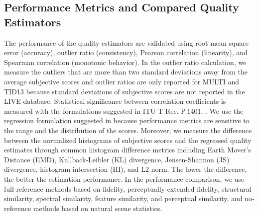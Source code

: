 \documentclass[draftcls,12pt, onecolumn]{IEEEtran}
\begin{document}
\subsection{Performance Metrics and Compared Quality Estimators}
\label{subsec:val_metrics}
The performance of the quality estimators are validated using root mean square error (accuracy), outlier ratio (consistency), Pearson correlation (linearity), and Spearman correlation (monotonic behavior). In the outlier ratio calculation, we measure the outliers that are more than two standard deviations away from the average subjective scores and outlier ratios are only reported for MULTI and TID13 because standard deviations of subjective scores are not reported in the LIVE database. Statistical significance between correlation coefficients is measured with the formulations suggested in ITU-T Rec. P.1401. \cite{ITU-T}. We use the regression formulation suggested in \cite{live2006} because performance metrics are sensitive to the range and the distribution of the scores. Moreover, we measure the difference between the normalized histograms of subjective scores and the regressed quality estimates through common histogram difference metrics including Earth Mover's Distance (EMD), Kullback-Leibler (KL) divergence,  Jensen-Shannon (JS) divergence, histogram intersection (HI), and L2 norm. The lower the difference, the better the estimation performance. In the performance comparison, we use full-reference methods based on fidelity, perceptually-extended fidelity, structural similarity, spectral similarity, feature similarity, and perceptual similarity, and no-reference methods based on natural scene statistics.
\vspace{-4.0mm}
\end{document}
